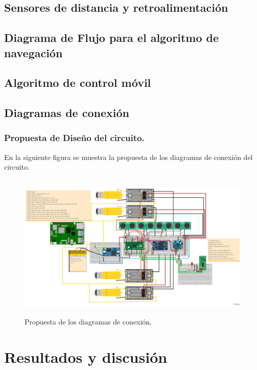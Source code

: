 \documentclass[12pt]{book} %
\begin{document}
\section{Sensores de distancia y retroalimentación
}
 \section{Diagrama de Flujo para el algoritmo de navegación}
		
\section{Algoritmo de control móvil} %
 \lhead[]{}
 
 \section{Diagramas de conexión}
	 \subsection{Propuesta de Diseño del circuito.}
	 En la siguiente figura se muestra la propuesta de los diagramas de conexión del circuito.
	\begin{figure}[H]
	\begin{center}
	\includegraphics[width =16cm,height =7cm]{Ayudame_Control.pdf}
	\caption{Propuesta de los diagramas de conexión.} 
	\end{center}
	\end{figure}
 
\chapter{Resultados y discusión}
  \lhead[]{}
\end{document}
